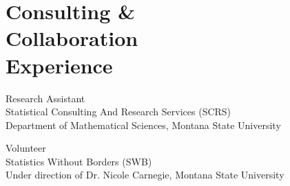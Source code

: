 \section{Consulting \& \\ Collaboration \\ Experience}

Research Assistant \hfill {} \\ 
    \indent \quad Statistical Consulting And Research Services (SCRS) \\
   \indent \quad Department of Mathematical Sciences, Montana State University

Volunteer \hfill {} \\ 
    \indent \quad Statistics Without Borders (SWB) \\
   \indent \quad Under direction of Dr. Nicole Carnegie, Montana State University